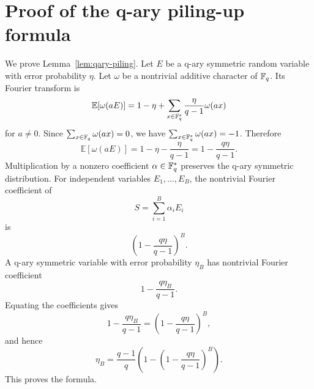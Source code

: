 \section{Proof of the q-ary piling-up formula}
\label{app:piling-up}

We prove Lemma~\ref{lem:qary-piling}.  Let $E$ be a q-ary symmetric random variable with error probability $\eta$.  Let $\omega$ be a nontrivial additive character of $\mathbb{F}_q$.  Its Fourier transform is
\[
    \mathbb{E}[\omega(aE)]
    =1-\eta+\sum_{x\in\mathbb{F}_q^*}\frac{\eta}{q-1}\omega(ax)
\]
for $a\ne0$.  Since $\sum_{x\in\mathbb{F}_q}\omega(ax)=0$, we have $\sum_{x\in\mathbb{F}_q^*}\omega(ax)=-1$.  Therefore
\[
    \mathbb{E}[\omega(aE)]
    =1-\eta-\frac{\eta}{q-1}
    =1-\frac{q\eta}{q-1}.
\]
Multiplication by a nonzero coefficient $\alpha\in\mathbb{F}_q^*$ preserves the q-ary symmetric distribution.  For independent variables $E_1,\ldots,E_B$, the nontrivial Fourier coefficient of
\[
    S=\sum_{i=1}^B\alpha_iE_i
\]
is
\[
    \left(1-\frac{q\eta}{q-1}\right)^B.
\]
A q-ary symmetric variable with error probability $\eta_B$ has nontrivial Fourier coefficient
\[
    1-\frac{q\eta_B}{q-1}.
\]
Equating the coefficients gives
\[
    1-\frac{q\eta_B}{q-1}
    =\left(1-\frac{q\eta}{q-1}\right)^B,
\]
and hence
\[
    \eta_B=\frac{q-1}{q}\left(1-\left(1-\frac{q\eta}{q-1}\right)^B\right).
\]
This proves the formula.

